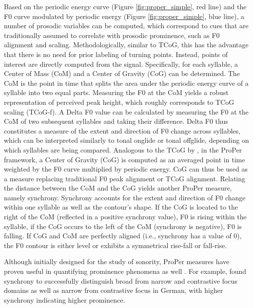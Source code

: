 Based on the periodic energy curve (Figure \ref{fig:proper_simple}, red line) and the F0 curve modulated by periodic energy (Figure \ref{fig:proper_simple}, blue line), a number of prosodic variables can be computed, which correspond to cues that are traditionally assumed to correlate with prosodic prominence, such as F0 alignment and scaling. Methodologically, similar to TCoG, this has the advantage that there is no need for prior labeling of turning points. Instead, points of interest are directly computed from the signal. Specifically, for each syllable, a Center of Mass (CoM) and a Center of Gravity (CoG) can be determined. The CoM is the point in time that splits the area under the periodic energy curve of a syllable into two equal parts. Measuring the F0 at the CoM yields a robust representation of perceived peak height, which roughly corresponds to TCoG scaling (TCoG-f). A Delta F0 value can be calculated by measuring the F0 at the CoM of two subsequent syllables and taking their difference. Delta F0 thus constitutes a measure of the extent and direction of F0 change across syllables, which can be interpreted similarly to tonal onglide or tonal offglide, depending on which syllables are being compared. Analogous to the TCoG by \citet{barnesTonalCenterGravity2012, barnesRampsIntonationalPhonology2021}, in the ProPer framework, a Center of Gravity (CoG) is computed as an averaged point in time weighted by the F0 curve multiplied by periodic energy. CoG can thus be used as a measure replacing traditional F0 peak alignment or TCoG alignment. Relating the distance between the CoM and the CoG yields another ProPer measure, namely synchrony. Synchrony accounts for the extent and direction of F0 change within one syllable as well as the contour's shape. If the CoG is located to the right of the CoM (reflected in a positive synchrony value), F0 is rising within the syllable, if the CoG occurs to the left of the CoM (synchrony is negative), F0 is falling. If CoG and CoM are perfectly aligned (i.e., synchrony has a value of 0), the F0 contour is either level or exhibits a symmetrical rise-fall or fall-rise.

Although initially designed for the study of sonority, ProPer measures have proven useful in quantifying prominence phenomena as well \citep{roessigTracingPhoneticSpace2022, sbrannaProsodicMarkingInformation2023}. For example, \citet{roessigTracingPhoneticSpace2022} found synchrony to successfully distinguish broad from narrow and contrastive focus domains as well as narrow from contrastive focus in German, with higher synchrony indicating higher prominence.

